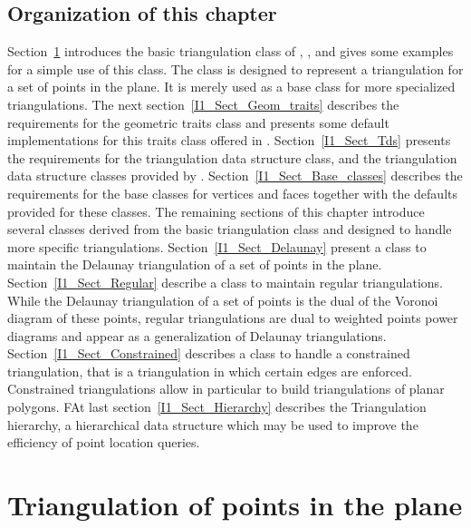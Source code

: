 \subsection*{Organization of this chapter}
Section~\ref{I1_Sect_Triangulation_2} introduces the basic triangulation class of \cgal ,
 ,  and gives some examples for a simple use of this class.
 The  class  is designed to represent 
a triangulation for a set of points in the plane. It is merely used
as a base class for more specialized triangulations.
The next section~\ref{I1_Sect_Geom_traits}
describes the requirements for the geometric
traits class and presents some default implementations
for this traits class offered in \cgal. 
Section~\ref{I1_Sect_Tds}  presents the requirements for the 
{triangulation data structure} class,
 and the {triangulation data structure} classes
provided by \cgal. 
Section~\ref{I1_Sect_Base_classes} describes the requirements
for the base classes for vertices and faces
together with the defaults provided for these classes.
The remaining sections of this chapter introduce
several classes derived from the basic triangulation class
and designed to handle more specific triangulations.
Section~\ref{I1_Sect_Delaunay} present a class to 
maintain the Delaunay triangulation of a set of points in the plane.
 Section~\ref{I1_Sect_Regular}
describe a class to maintain regular triangulations.
While the Delaunay triangulation of a set of points
is the dual of the Voronoi
diagram of these points,
 regular triangulations are dual to weighted points power diagrams
and  appear as a generalization of
Delaunay triangulations. Section~\ref{I1_Sect_Constrained} 
describes a class to handle a constrained triangulation,
that is a triangulation in which certain edges are enforced.
Constrained triangulations allow in particular to build  
triangulations of planar polygons.
FAt last section~\ref{I1_Sect_Hierarchy} describes the
Triangulation hierarchy, a hierarchical data
structure which may be used to improve the efficiency
of point location queries.

 

\section{Triangulation of points in the plane }
\label{I1_Sect_Triangulation_2}

